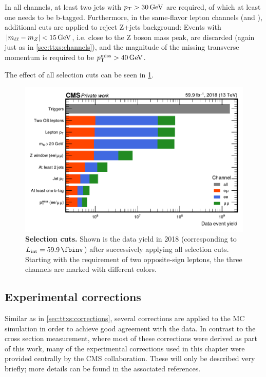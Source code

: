 In all channels, at least two jets with $\pt > \SI{30}{\GeV}$ are required, of which at least one needs to be b-tagged. Furthermore, in the same-flavor lepton channels (\ee and \mumu), additional cuts are applied to reject Z+jets background: Events with $|\mll - m_Z| < \SI{15}{\GeV}$, i.e. close to the Z boson mass peak, are discarded (again just as in \cref{sec:ttxs:channels}), and the magnitude of the missing transverse momentum is required to be $\ptmiss > \SI{40}{\GeV}$.

The effect of all selection cuts can be seen in \cref{fig:ah:cutflows}.

\begin{figure}[t]
    \centering
    \includegraphics[width=\textwidth]{figures/ah/cutflows.pdf}
    \caption{\textbf{Selection cuts.} Shown is the data yield in 2018 (corresponding to $\Lint = \lumiVIII$) after successively applying all selection cuts. Starting with the requirement of two opposite-sign leptons, the three channels are marked with different colors.}
    \label{fig:ah:cutflows}
\end{figure}

\subsection{Experimental corrections}
\label{sec:ah:expcorrs}

Similar as in \cref{sec:ttxs:corrections}, several corrections are applied to the MC simulation in order to achieve good agreement with the data. In contrast to the \ttbar cross section measurement, where most of these corrections were derived as part of this work, many of the experimental corrections used in this chapter were provided centrally by the CMS collaboration. These will only be described very briefly; more details can be found in the associated references.

